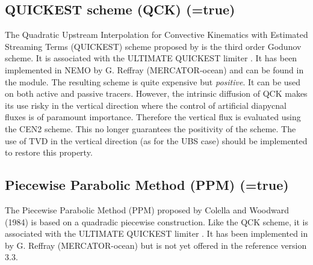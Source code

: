 \subsection   [QUICKEST scheme (QCK) (\np{ln\_traadv\_qck})]
			{QUICKEST scheme (QCK) (=true)}
\label{TRA_adv_qck}

The Quadratic Upstream Interpolation for Convective Kinematics with 
Estimated Streaming Terms (QUICKEST) scheme proposed by \citet{Leonard1979} 
is the third order Godunov scheme. It is associated with the ULTIMATE QUICKEST 
limiter \citep{Leonard1991}. It has been implemented in NEMO by G. Reffray 
(MERCATOR-ocean) and can be found in the  module.
The resulting scheme is quite expensive but \emph{positive}. 
It can be used on both active and passive tracers. 
However, the intrinsic diffusion of QCK makes its use risky in the vertical 
direction where the control of artificial diapycnal fluxes is of paramount importance. 
Therefore the vertical flux is evaluated using the CEN2 scheme. 
This no longer guarantees the positivity of the scheme. The use of TVD in the vertical 
direction (as for the UBS case) should be implemented to restore this property.


\subsection   [Piecewise Parabolic Method (PPM) (\np{ln\_traadv\_ppm})]
			{Piecewise Parabolic Method (PPM) (=true)}
\label{TRA_adv_ppm}

The Piecewise Parabolic Method (PPM) proposed by Colella and Woodward (1984) 
is based on a quadradic piecewise construction. Like the QCK scheme, it is associated 
with the ULTIMATE QUICKEST limiter \citep{Leonard1991}. It has been implemented 
in \NEMO by G. Reffray (MERCATOR-ocean) but is not yet offered in the reference 
version 3.3.

